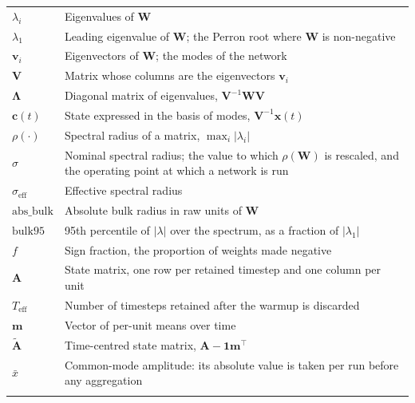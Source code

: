 \begin{longtable}{>{\raggedright\arraybackslash}p{3.4cm}p{\dimexpr\linewidth-3.4cm-4\tabcolsep\relax}}
    $\lambda_i$ & Eigenvalues of $\mathbf{W}$ \\
    $\lambda_1$ & Leading eigenvalue of $\mathbf{W}$; the Perron root where $\mathbf{W}$ is non-negative \\
    $\mathbf{v}_i$ & Eigenvectors of $\mathbf{W}$; the modes of the network \\
    $\mathbf{V}$ & Matrix whose columns are the eigenvectors $\mathbf{v}_i$ \\
    $\boldsymbol{\Lambda}$ & Diagonal matrix of eigenvalues, $\mathbf{V}^{-1}\mathbf{W}\mathbf{V}$ \\
    $\mathbf{c}(t)$ & State expressed in the basis of modes, $\mathbf{V}^{-1}\mathbf{x}(t)$ \\
    $\rho(\cdot)$ & Spectral radius of a matrix, $\operatorname{max}_i|\lambda_i|$ \\
    $\sigma$ & Nominal spectral radius; the value to which $\rho(\mathbf{W})$ is rescaled, and the operating point at which a network is run \\
    $\sigma_{\mathrm{eff}}$ & Effective spectral radius \\
    $\mathrm{abs\_bulk}$ & Absolute bulk radius in raw units of $\mathbf{W}$ \\
    $\mathrm{bulk95}$ & 95th percentile of $|\lambda|$ over the spectrum, as a fraction of $|\lambda_1|$ \\
    $f$ & Sign fraction, the proportion of weights made negative \\
    \addlinespace

    $\mathbf{A}$ & State matrix, one row per retained timestep and one column per unit \\
    $T_{\mathrm{eff}}$ & Number of timesteps retained after the warmup is discarded \\
    $\mathbf{m}$ & Vector of per-unit means over time \\
    $\tilde{\mathbf{A}}$ & Time-centred state matrix, $\mathbf{A} - \mathbf{1}\mathbf{m}^{\top}$ \\
    $\bar{x}$ & Common-mode amplitude: its absolute value is taken per run before any aggregation \\
    \addlinespace


\end{longtable}
